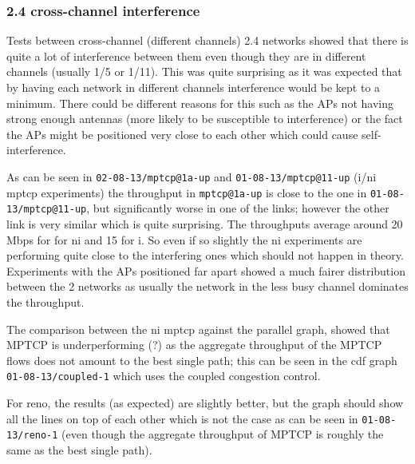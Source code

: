 \subsubsection{2.4 cross-channel interference}
Tests between cross-channel (different channels) 2.4 networks showed that there
is quite a lot of interference between them even though they are in different
channels (usually 1/5 or 1/11). This was quite surprising as it was expected
that by having each network in different channels interference would be kept to
a minimum. There could be different reasons for this such as the APs not having
strong enough antennas (more likely to be susceptible to interference) or the
fact the APs might be positioned very close to each other which could cause
self-interference.

As can be seen in \texttt{02-08-13/mptcp@1a-up} and
\texttt{01-08-13/mptcp@11-up} (i/ni mptcp experiments) the throughput in
\texttt{mptcp@1a-up} is close to the one in \texttt{01-08-13/mptcp@11-up}, but
significantly worse in one of the links; however the other link is very similar
which is quite surprising. The throughputs average around 20 Mbps for for ni and
15 for i. So even if so slightly the ni experiments are performing quite close
to the interfering ones which should not happen in theory. Experiments with the
APs positioned far apart showed a much fairer distribution between the 2
networks as usually the network in the less busy channel dominates the
throughput.

The comparison between the ni mptcp against the parallel graph, showed that
MPTCP is underperforming (?) as the aggregate throughput of the MPTCP flows does
not amount to the best single path; this can be seen in the cdf graph
\texttt{01-08-13/coupled-1} which uses the coupled congestion control.

For reno, the results (as expected) are slightly better, but the graph should
show all the lines on top of each other which is not the case as can be seen in
\texttt{01-08-13/reno-1} (even though the aggregate throughput of MPTCP is
roughly the same as the best single path).

